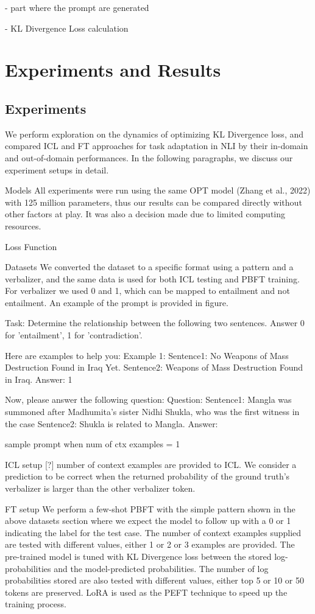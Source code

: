 \documentclass[10pt,twocolumn,letterpaper]{article}
\begin{document}
- part where the prompt are generated 

- KL Divergence Loss calculation



\section{Experiments and Results}
\subsection*{Experiments}
We perform exploration on the dynamics of optimizing  KL Divergence loss, and compared ICL and FT approaches for task adaptation in NLI by their in-domain and out-of-domain performances. In the following paragraphs, we discuss our experiment setups in detail.

Models 
All experiments were run using the same OPT model (Zhang et al., 2022) with 125 million parameters, thus our results can be compared directly without other factors at play. It was also a decision made due to limited computing resources.

Loss Function

Datasets 
We converted the dataset to a specific format using a pattern and a verbalizer, and the same data is used for both ICL testing and PBFT training. For verbalizer we used 0 and 1, which can be mapped to entailment and not entailment. An example of the prompt is provided in figure.

Task: Determine the relationship between the following two sentences. Answer 0 for 'entailment', 1 for 'contradiction'.

Here are examples  to help you:
Example 1:
Sentence1: No Weapons of Mass Destruction Found in Iraq Yet.
Sentence2: Weapons of Mass Destruction Found in Iraq.
Answer:  1

Now, please answer the following question: 
Question:
Sentence1: Mangla was summoned after Madhumita's sister Nidhi Shukla, who was the first witness in the case      
Sentence2: Shukla is related to Mangla.          
Answer:

sample prompt when num of ctx examples = 1

ICL setup
[?] number of context examples are provided to ICL. We consider a prediction to be correct when the returned probability of the ground truth’s verbalizer is larger than the other verbalizer token.

FT setup 
We perform a few-shot PBFT with the simple pattern shown in the above datasets section where we expect the model to follow up with a 0 or 1 indicating the label for the test case. The number of context examples supplied are tested with different values, either 1 or 2 or 3 examples are provided. The pre-trained model is tuned with KL Divergence loss between the stored log-probabilities and the model-predicted probabilities. The number of log probabilities stored are also tested with different values, either top 5 or 10 or 50 tokens are preserved. LoRA is used as the PEFT technique to speed up the training process.
\end{document}
